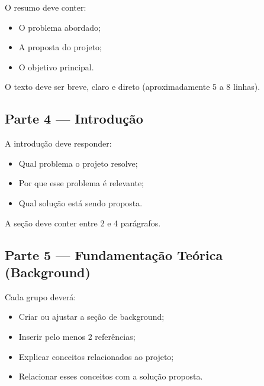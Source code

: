 \begin{boxAtividade}

O resumo deve conter:

\begin{itemize}
\item O problema abordado;
\item A proposta do projeto;
\item O objetivo principal.
\end{itemize}

O texto deve ser breve, claro e direto (aproximadamente 5 a 8 linhas).

\end{boxAtividade}


\subsection{Parte 4 — Introdução}

\begin{boxAtividade}

A introdução deve responder:

\begin{itemize}
\item Qual problema o projeto resolve;
\item Por que esse problema é relevante;
\item Qual solução está sendo proposta.
\end{itemize}

A seção deve conter entre 2 e 4 parágrafos.

\end{boxAtividade}


\subsection{Parte 5 — Fundamentação Teórica (Background)}

\begin{boxAtividade}

Cada grupo deverá:

\begin{itemize}
\item Criar ou ajustar a seção de background;
\item Inserir pelo menos 2 referências;
\item Explicar conceitos relacionados ao projeto;
\item Relacionar esses conceitos com a solução proposta.
\end{itemize}

\end{boxAtividade}

